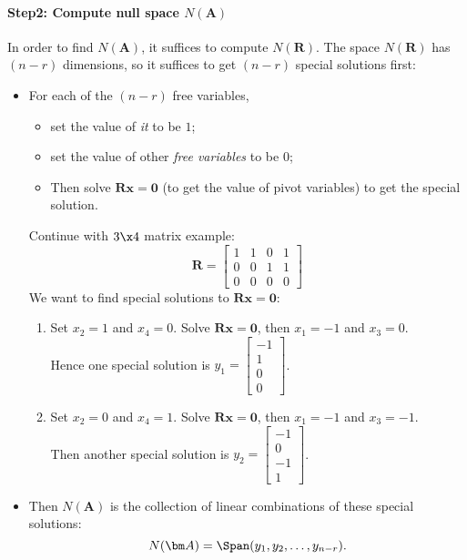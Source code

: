 \paragraph{Step2: Compute null space $N(\bm A)$}
In order to find $N(\bm A)$, it suffices to compute $N(\bm R)$. The space $N(\bm R)$ has $(n-r)$ dimensions, so it suffices to get $(n-r)$ special solutions first:
\begin{itemize}
\item
For each of the $(n-r)$ free variables,
\begin{itemize}
\item
set the value of \emph{it} to be $1$;
\item
set the value of other \emph{free variables} to be 0;
\item
Then solve $\bm{Rx} = \bm 0$ (to get the value of pivot variables) to get the special solution.
\end{itemize}
\begin{example}
Continue with $3\x 4$ matrix example:
\[
\bm R = \begin{bmatrix}
1&1&0&1\\0&0&1&1\\0&0&0&0
\end{bmatrix}\]
We want to find special solutions to $\bm{Rx} = \bm 0$:
\begin{enumerate}
\item
Set $x_2=1$ and $x_4=0$. Solve $\bm{Rx} = \bm 0$, then $x_1=-1$ and $x_3 = 0$. \\Hence one special solution is $y_1 = \begin{bmatrix}
-1\\1\\0\\0
\end{bmatrix}$.
\item
Set $x_2=0$ and $x_4=1$. Solve $\bm{Rx} = \bm 0$, then $x_1=-1$ and $x_3 = -1$. \\Then another special solution is $y_2 = \begin{bmatrix}
-1\\0\\-1\\1
\end{bmatrix}$.
\end{enumerate}
\end{example}
\item
Then $N(\bm A)$ is the collection of linear combinations of these special solutions:
\[
N(\bm A) = \Span(y_1,y_2,\dots,y_{n-r}).
\]
\begin{example}

\end{example}
\end{itemize}
